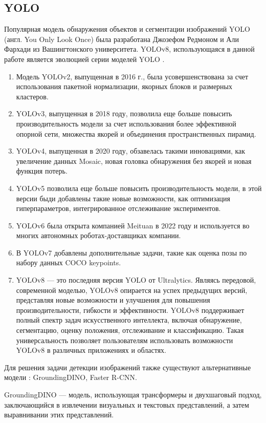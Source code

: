 \subsection{YOLO}

Популярная модель обнаружения объектов и сегментации изображений YOLO (англ. You Only Look Once) была разработана Джозефом Редмоном и Али Фархади из Вашингтонского университета. YOLOv8, использующаяся в данной работе является эволюцией серии моделей YOLO \cite{YOLOv8}.
\begin{enumerate}
\item Модель YOLOv2, выпущенная в 2016 г., была усовершенствована за счет использования пакетной нормализации, якорных блоков и размерных кластеров.
\item YOLOv3, выпущенная в 2018 году, позволила еще больше повысить производительность модели за счет использования более эффективной опорной сети, множества якорей и объединения пространственных пирамид.
\item YOLOv4, выпущенная в 2020 году, обзавелась такими инновациями, как увеличение данных Mosaic, новая головка обнаружения без якорей и новая функция потерь.
\item YOLOv5 позволила еще больше повысить производительность модели, в этой версии быди добавлены такие новые возможности, как оптимизация гиперпараметров, интегрированное отслеживание экспериментов.
\item YOLOv6 была открыта компанией Meituan в 2022 году и используется во многих автономных роботах-доставщиках компании.
\item В YOLOv7 добавлены дополнительные задачи, такие как оценка позы по набору данных COCO keypoints.
\item YOLOv8 --- это последняя версия YOLO от Ultralytics. Являясь передовой, современной  моделью, YOLOv8 опирается на успех предыдущих версий, представляя новые возможности и улучшения для повышения производительности, гибкости и эффективности. YOLOv8 поддерживает полный спектр задач искусственного интеллекта, включая обнаружение, сегментацию, оценку положения, отслеживание и классификацию. Такая универсальность позволяет пользователям использовать возможности YOLOv8 в различных приложениях и областях.
\end{enumerate}


Для решения задачи детекции изображений также существуют альтернативные модели \cite{object_detection_models}: GroundingDINO, Faster R-CNN.

GroundingDINO --- модель, использующая трансформеры  и двухшаговый подход, заключающийся в извлечении визуальных и текстовых представлений, а затем выравнивании этих представлений.


